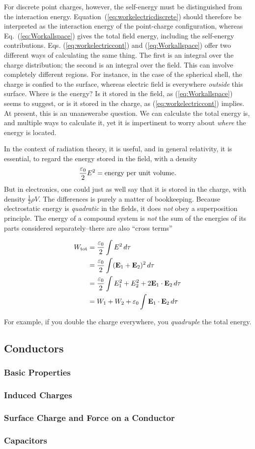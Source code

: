 			For discrete point charges, however, the self-energy must be distinguished from the interaction
			energy. Equation~(\ref{eq:workelectricdiscrete}) should therefore be interpreted as the interaction
			energy of the point-charge configuration, whereas Eq.~(\ref{eq:Workallspace}) gives the total field
			energy, including the self-energy contributions.
			Eqs. (\ref{eq:workelectriccont}) and (\ref{eq:Workallspace}) offer two different ways 
			of calculating the same thing. The first is an integral over the charge distribution; the 
			second is an integral over the field. This can involve completely different regions.
			For instance, in  the case of the spherical shell, the charge is confied to the 
			surface, whereas electric field is everywhere \textit{outside} this surface. Where is the energy?
			Is it stored in the field, as (\ref{eq:Workallspace}) seems to suggest, or is it stored in the 
			charge, as (\ref{eq:workelectriccont}) implies. At present, this is an unanswerabe
			question. We can calculate the total energy is, and multiple ways to calculate it,
			yet it is impertinent to worry about \textit{where} the energy is located. 

			In the context of radiation theory, it is useful, and in general relativity, it is essential,
			to regard the energy stored in the field, with a density
			\[
			\frac{\varepsilon_0}{2}E^2 = \text{energy per unit volume.} 
			\]
			But in electronics, one could just as well say that it is stored in the charge,
			with density $\frac{1}{2}\rho V$. The differences is purely a matter of bookkeeping.
			Because  electrostatic energy is \textit{quadratic} in the fields, it does \textit{not}
			obey a superposition principle. The energy of a compound system is \textit{not} the sum
			of the energies of its parts considered separately--there are also ``cross terms''

			\begin{align*}
				W_\text{tot}
				&= \frac{\varepsilon_0}{2}\int E^2 \dd{\tau}\\
				&= \frac{\varepsilon_0}{2}\int (\vb{E}_1 + \vb{E}_2)^2\dd{\tau}\\
				&= \frac{\varepsilon_0}{2}\int E_1^2 + E_2^2 + 2\vb{E}_1\cdot\vb{E}_2 \dd{\tau}\\
				&= W_1 + W_2 + \varepsilon_0\int\vb{E}_1\cdot\vb{E}_2 \dd{\tau}
			\end{align*}

			For example, if you double the charge everywhere, you \textit{quadruple} the
			total energy.
	\newpage
\subsection{Conductors}
	\subsubsection{Basic Properties}
	\subsubsection{Induced Charges}
	\subsubsection{Surface Charge and Force on a Conductor}
	\subsubsection{Capacitors}
\newpage
